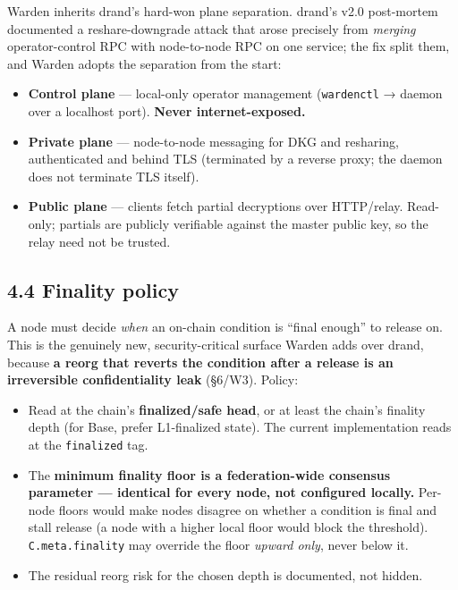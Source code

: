 \documentclass[
  11pt,
]{article}
\providecommand{\tightlist}{%
  \setlength{\itemsep}{0pt}\setlength{\parskip}{0pt}}
\begin{document}
Warden inherits drand's hard-won plane separation. drand's v2.0
post-mortem documented a reshare-downgrade attack that arose precisely
from \emph{merging} operator-control RPC with node-to-node RPC on one
service; the fix split them, and Warden adopts the separation from the
start:

\begin{itemize}
\tightlist
\item
  \textbf{Control plane} --- local-only operator management
  (\texttt{wardenctl} → daemon over a localhost port). \textbf{Never
  internet-exposed.}
\item
  \textbf{Private plane} --- node-to-node messaging for DKG and
  resharing, authenticated and behind TLS (terminated by a reverse
  proxy; the daemon does not terminate TLS itself).
\item
  \textbf{Public plane} --- clients fetch partial decryptions over
  HTTP/relay. Read-only; partials are publicly verifiable against the
  master public key, so the relay need not be trusted.
\end{itemize}

\subsection{4.4 Finality policy}\label{finality-policy}

A node must decide \emph{when} an on-chain condition is ``final enough''
to release on. This is the genuinely new, security-critical surface
Warden adds over drand, because \textbf{a reorg that reverts the
condition after a release is an irreversible confidentiality leak}
(§6/W3). Policy:

\begin{itemize}
\tightlist
\item
  Read at the chain's \textbf{finalized/safe head}, or at least the
  chain's finality depth (for Base, prefer L1-finalized state). The
  current implementation reads at the \texttt{finalized} tag.
\item
  The \textbf{minimum finality floor is a federation-wide consensus
  parameter --- identical for every node, not configured locally.}
  Per-node floors would make nodes disagree on whether a condition is
  final and stall release (a node with a higher local floor would block
  the threshold). \texttt{C.meta.finality} may override the floor
  \emph{upward only}, never below it.
\item
  The residual reorg risk for the chosen depth is documented, not
  hidden.
\end{itemize}
\end{document}
